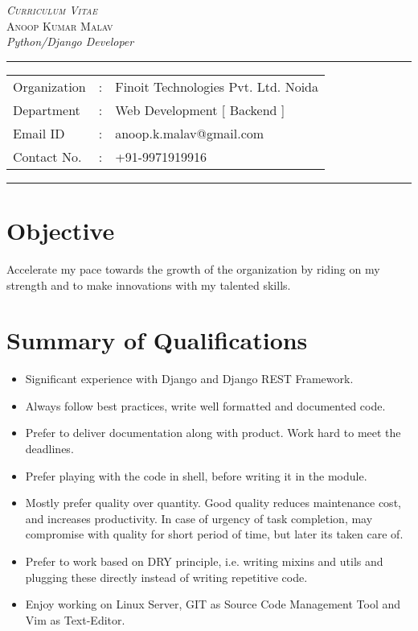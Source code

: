 \documentclass[10pt]{article}
\begin{document}
\begin{center}

\textsc{\huge \textit{Curriculum Vitae}}
\\[0.5cm]
\textsc{\Large Anoop Kumar Malav}
 \\[0.1cm]

\textit{\large Python/Django Developer} \\
\addvspace{0.04cm}
\rule[0.07cm]{17.52cm}{0.01cm}
\begin{tabular}{l c l}
Organization      &:& Finoit Technologies Pvt. Ltd. Noida \\
Department        &:& Web Development [ Backend ] \\
Email ID          &:& anoop.k.malav@gmail.com \\
Contact No.       &:& +91-9971919916 \\
\end{tabular}

\addvspace{0.02cm}
\rule[0.02cm]{17.52cm}{0.01cm}
\end{center}

\section*{Objective}
Accelerate my pace towards the growth of the organization by riding on my strength and
to make innovations with my talented skills.

\section*{Summary of Qualifications}

\begin{itemize}
 \item Significant experience with Django and Django REST Framework.
 \item Always follow best practices, write well formatted and documented code.
 \item Prefer to deliver documentation along with product. Work hard to meet the deadlines.
 \item Prefer playing with the code in shell, before writing it in the module.
 \item Mostly prefer quality over quantity. Good quality reduces maintenance cost, and increases productivity. In case of urgency of task completion, may compromise with quality for short period of time, but later its taken care of.
 \item Prefer to work based on DRY principle, i.e. writing mixins and utils and plugging these directly instead of writing repetitive code.
 \item Enjoy working on Linux Server, GIT as Source Code Management Tool and Vim as Text-Editor.
\end{itemize}
\end{document}
